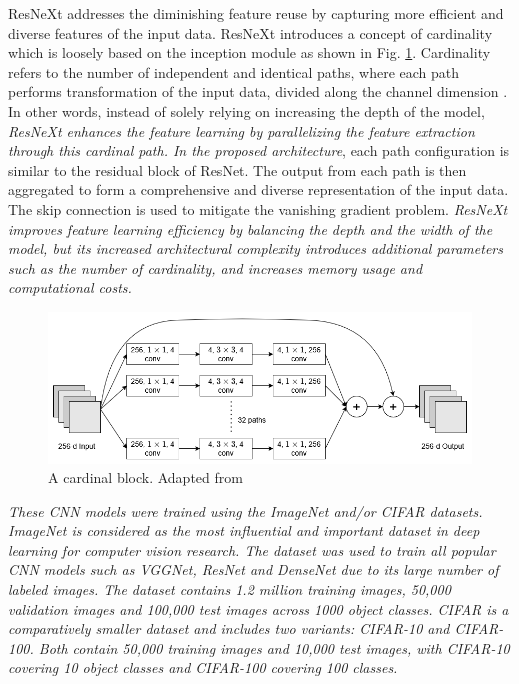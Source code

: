 \documentclass[preprint,12pt]{elsarticle}
\begin{document}
ResNeXt addresses the diminishing feature reuse by capturing more efficient and diverse features of the input data. ResNeXt introduces a concept of cardinality which is loosely based on the inception module as shown in Fig. \ref{fig_deep_sv_learning_cnn_resnext}. Cardinality refers to the number of independent and identical paths, where each path performs transformation of the input data, divided along the channel dimension  \citep{xie_aggregated_2017}. In other words, instead of solely relying on increasing the depth of the model, \emph{ResNeXt enhances the feature learning by parallelizing the feature extraction through this cardinal path. In the proposed architecture}, each path configuration is similar to the residual block of ResNet. The output from each path is then aggregated to form a comprehensive and diverse representation of the input data. The skip connection is used to mitigate the vanishing gradient problem. \emph{ResNeXt improves feature learning efficiency by balancing the depth and the width of the model, but its increased architectural complexity introduces additional parameters such as the number of cardinality, and increases memory usage and computational costs.}

\begin{figure}[h!]
    \centering
    \includegraphics[scale=0.45]{fig_deep_sv_learning_cnn_resnext.png}
    \caption{A cardinal block. Adapted from \citep{xie_aggregated_2017}}
    \label{fig_deep_sv_learning_cnn_resnext}
\end{figure}

\emph{These CNN models were trained using the ImageNet \citep{noauthor_imagenet_nodate}  and/or CIFAR \citep{noauthor_cifar-10_nodate} datasets. ImageNet is considered as the most influential and important dataset in deep learning for computer vision research. The dataset was used to train all popular CNN models such as VGGNet, ResNet and DenseNet due to its large number of labeled images. The dataset contains 1.2 million training images, 50,000 validation images and 100,000 test images across 1000 object classes. CIFAR is a comparatively smaller dataset and includes two variants: CIFAR-10 and CIFAR-100. Both contain 50,000 training images and 10,000 test images, with CIFAR-10 covering 10 object classes and CIFAR-100 covering 100 classes.}
\end{document}
